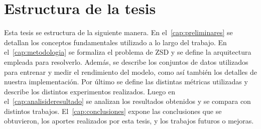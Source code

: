 \section{Estructura de la tesis} \label{sec:estructuradelatesis}

Esta tesis se estructura de la siguiente manera. En el~\autoref{cap:preliminares} se detallan los conceptos fundamentales utilizado a lo largo del trabajo. En el~\autoref{cap:metodologia} se formaliza el problema de ZSD y se define la arquitectura empleada para resolverlo. Además, se describe los conjuntos de datos utilizados para entrenar y medir el rendimiento del modelo, como así también los detalles de nuestra implementación. Por último se define las distintas métricas utilizadas y describe los distintos experimentos realizados. Luego en el~\autoref{cap:analisideresultado} se analizan los resultados obtenidos y se compara con distintos trabajos. El~\autoref{cap:conclusiones} expone las conclusiones que se obtuvieron, los aportes realizados por esta tesis, y los trabajos futuros o mejoras.

